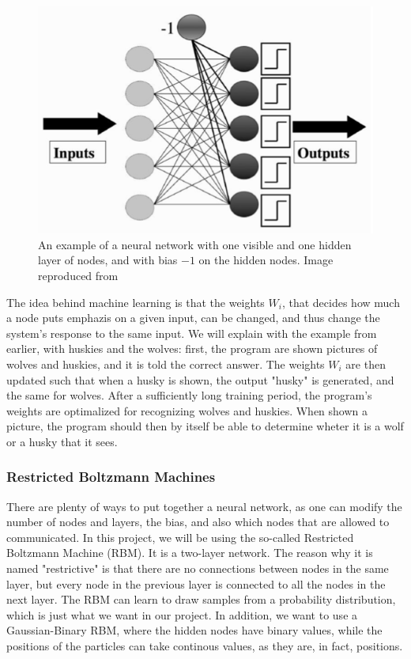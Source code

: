 \documentclass[norsk,a4paper,12pt]{article}
\begin{document}
 \begin{figure} [H]
	\centering
	\includegraphics[scale=0.5]{plots/neural_network.png}
	\caption{An example of a neural network with one visible and one hidden layer of nodes, and with bias $-1$ on the hidden nodes. Image reproduced from \cite{Marsland} }
	\label{fig:neural_network}
\end{figure}

The idea behind machine learning is that the weights $W_i$, that decides how much a node puts emphazis on a given input, can be changed, and thus change the system's response to the same input. We will explain with the example from earlier, with huskies and the wolves: first, the program are shown pictures of wolves and huskies, and it is told the correct answer. The weights $W_i$ are then updated such that when a husky is shown, the output "husky" is generated, and the same for wolves. After a sufficiently long training period, the program's weights are optimalized for recognizing wolves and huskies. When shown a picture, the program should then by itself be able to determine wheter it is a wolf or a husky that it sees. 

\subsubsection{Restricted Boltzmann Machines} \label{sec:RBM}
There are plenty of ways to put together a neural network, as one can modify the number of nodes and layers, the bias, and also which nodes that are allowed to communicated. In this project, we will be using the so-called Restricted Boltzmann Machine (RBM). It is a two-layer network. The reason why it is named "restrictive" is that there are no connections between nodes in the same layer, but every node in the previous layer is connected to all the nodes in the next layer. The RBM can learn to draw samples from a probability distribution, which is just what we want in our project. In addition, we want to use a Gaussian-Binary RBM, where the hidden nodes have binary values, while the positions of the particles can take continous values, as they are, in fact, positions. 
\end{document}
